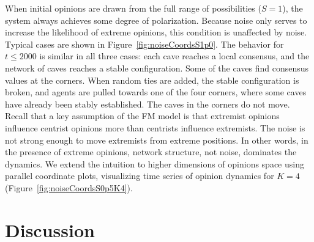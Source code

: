 When initial opinions are drawn from the full range of possibilities ($S=1$), the system always achieves some degree of polarization. Because noise only serves to increase the likelihood of extreme opinions, this condition is unaffected by noise. 
 Typical cases are shown in Figure~\ref{fig:noiseCoordsS1p0}. The behavior for
$t\leq 2000$ is similar in all three cases: each cave reaches a local consensus,
and the network of caves reaches a stable configuration. 
Some of the caves find consensus values at the corners. When
random ties are added, the stable configuration is broken, and agents are
pulled towards one of the four corners, where some caves have already 
been stably established. The caves in the corners do not move. Recall that a key assumption of the FM model is that extremist opinions influence centrist opinions more than centrists influence extremists. 
The noise is not strong enough to move extremists from extreme positions. In other words, in the presence of extreme opinions, network structure, not noise, dominates the dynamics.
%
We extend the intuition to higher dimensions of opinions space using parallel coordinate plots, visualizing time series of opinion dynamics for $K=4$ (Figure~\ref{fig:noiseCoordsS0p5K4}). 

\section{Discussion}

